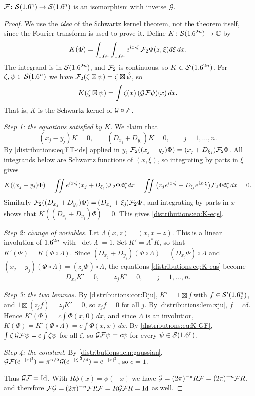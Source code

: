 \begin{theorem}\label{distributions:thm:inversion}
$\mathcal{F}\colon\mathcal{S}(1.6^n)\to\mathcal{S}(1.6^n)$ is an isomorphism with inverse $\mathcal{G}$.
\end{theorem}
\begin{proof}
We use the \emph{idea} of the Schwartz kernel theorem, not the theorem itself, since
the Fourier transform is used to prove it. Define $K\colon\mathcal{S}(1.6^{2n})\to\mathbb{C}$ by
\[
  K(\Phi)=\int_{\R^n}\int_{\R^n}e^{ix\cdot\xi}\,\cF_2\Phi(x,\xi)\,\dbar\xi\,dx.
\]
The integrand is in $\mathcal{S}(1.6^{2n})$, and $\mathcal{F}_2$ is continuous, so
$K\in\mathcal{S}'(1.6^{2n})$. For $\zeta,\psi\in\mathcal{S}(1.6^n)$ we have
$\mathcal{F}_2(\zeta\boxtimes\psi)=\zeta\boxtimes\hat\psi$, so
\begin{equation}\label{distributions:eq:K-GF}
  K(\zeta\boxtimes\psi)=\int\zeta(x)\,(\mathcal{G}\mathcal{F}\psi)(x)\,dx.
\end{equation}
That is, $K$ is the Schwartz kernel of $\mathcal{G}\circ\mathcal{F}$.

\emph{Step 1: the equations satisfied by $K$.} We claim that
\begin{equation}\label{distributions:eq:K-eqs}
  (x_j-y_j)K=0,\qquad(D_{x_j}+D_{y_j})K=0,\qquad j=1,\dots,n.
\end{equation}
By \eqref{distributions:eq:FT-ids} applied in $y$,
$\mathcal{F}_2((x_j-y_j)\Phi)=(x_j+D_{\xi_j})\mathcal{F}_2\Phi$. All integrands below are Schwartz
functions of $(x,\xi)$, so integrating by parts in $\xi$ gives
\[
  K((x_j-y_j)\Phi)=\iint e^{ix\cdot\xi}(x_j+D_{\xi_j})\cF_2\Phi\,\dbar\xi\,dx
  =\iint\big(x_je^{ix\cdot\xi}-D_{\xi_j}e^{ix\cdot\xi}\big)\cF_2\Phi\,\dbar\xi\,dx=0.
\]
Similarly $\mathcal{F}_2((D_{x_j}+D_{y_j})\Phi)=(D_{x_j}+\xi_j)\mathcal{F}_2\Phi$, and integrating by
parts in $x$ shows that $K((D_{x_j}+D_{y_j})\Phi)=0$. This gives
\eqref{distributions:eq:K-eqs}.

\emph{Step 2: change of variables.} Let $\Lambda(x,z)=(x,x-z)$. This is a linear
involution of $1.6^{2n}$ with $|\det\Lambda|=1$. Set $K'=\Lambda^*K$, so that
$K'(\Phi)=K(\Phi\circ\Lambda)$. Since
$(D_{x_j}+D_{y_j})(\Phi\circ\Lambda)=(D_{x_j}\Phi)\circ\Lambda$ and
$(x_j-y_j)(\Phi\circ\Lambda)=(z_j\Phi)\circ\Lambda$, the equations
\eqref{distributions:eq:K-eqs} become
\[
  D_{x_j}K'=0,\qquad z_jK'=0,\qquad j=1,\dots,n.
\]

\emph{Step 3: the two lemmas.} By \cref{distributions:cor:Dju}, $K'=1\boxtimes f$ with
$f\in\mathcal{S}'(1.6^n_z)$, and $1\boxtimes(z_jf)=z_jK'=0$, so $z_jf=0$ for all $j$. By
\cref{distributions:lem:xju}, $f=c\delta$. Hence
$K'(\Phi)=c\int\Phi(x,0)\,dx$, and since $\Lambda$ is an involution,
$K(\Phi)=K'(\Phi\circ\Lambda)=c\int\Phi(x,x)\,dx$. By \eqref{distributions:eq:K-GF},
$\int\zeta\,\mathcal{G}\mathcal{F}\psi=c\int\zeta\psi$ for all $\zeta$, so
$\mathcal{G}\mathcal{F}\psi=c\psi$ for every $\psi\in\mathcal{S}(1.6^n)$.

\emph{Step 4: the constant.} By \cref{distributions:lem:gaussian},
$\mathcal{G}\mathcal{F}(e^{-|x|^2})=\pi^{n/2}\mathcal{G}(e^{-|\xi|^2/4})=e^{-|x|^2}$, so $c=1$.

Thus $\mathcal{G}\mathcal{F}=\operatorname{Id}$. With $R\phi(x)=\phi(-x)$ we have
$\mathcal{G}=(2\pi)^{-n}R\mathcal{F}=(2\pi)^{-n}\mathcal{F} R$, and therefore
$\mathcal{F}\mathcal{G}=(2\pi)^{-n}\mathcal{F} R\mathcal{F}=R\mathcal{G}\mathcal{F} R=\operatorname{Id}$ as well.
\end{proof}

